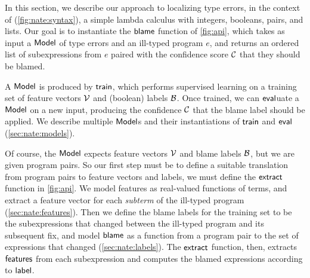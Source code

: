 \label{sec:nate:learning}
In this section, we describe our approach to localizing type errors, in the
context
of \lang (\autoref{fig:nate:syntax}), a simple lambda calculus with integers,
booleans, pairs, and lists.
%
Our goal is to instantiate the $\mathsf{blame}$ function of
\autoref{fig:api}, which takes as input a $\mathsf{Model}$ of type errors and an
ill-typed program $e$, and returns an ordered list of subexpressions
from $e$ paired with the confidence score $\mathcal{C}$ that they should be
blamed.

A $\mathsf{Model}$ is produced by $\mathsf{train}$, which performs
supervised learning on a training set of feature vectors $\mathcal{V}$ and
(boolean) labels $\mathcal{B}$.
%
Once trained, we can $\mathsf{eval}$uate a $\mathsf{Model}$ on a new input,
producing the confidence $\mathcal{C}$ that the blame label should be
applied.
%
We describe multiple $\mathsf{Model}$s and their instantiations of
$\mathsf{train}$ and $\mathsf{eval}$
(\autoref{sec:nate:models}).

Of course, the $\mathsf{Model}$ expects feature vectors $\mathcal{V}$ and blame labels
$\mathcal{B}$, but we are given program pairs.
%
So our first step must be to define a suitable translation from program
pairs to feature vectors and labels, \ie we must define the
$\mathsf{extract}$ function in \autoref{fig:api}.
%
We model features as real-valued functions of
terms, and extract a feature vector for each \emph{subterm}
of the ill-typed program (\autoref{sec:nate:features}).
%
Then we define the blame labels for the training set to be the
subexpressions that changed between the ill-typed program and its
subsequent fix, and model $\mathsf{blame}$ as a function from a program pair
to the set of expressions that changed (\autoref{sec:nate:labels}).
%
The $\mathsf{extract}$ function, then, extracts $\mathsf{features}$ from each
subexpression and computes the blamed expressions according to
$\mathsf{label}$.




\label{sec:nate:features}



